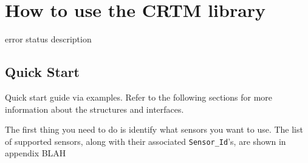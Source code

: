 \chapter{How to use the CRTM library}

error status description

\section{Quick Start}

Quick start guide via examples. Refer to the following sections for more information about the structures and interfaces.

The first thing you need to do is identify what sensors you want to use. The list of supported sensors, along with their associated \texttt{Sensor\_Id}'s, are shown in appendix BLAH


